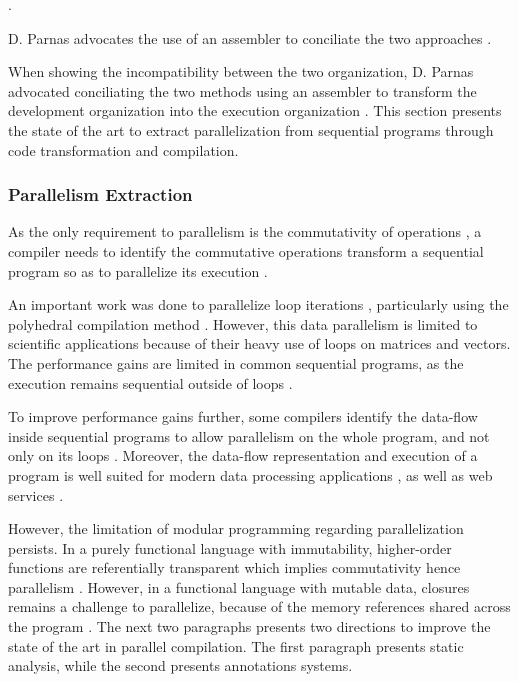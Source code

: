 .

D. Parnas advocates the use of an assembler to conciliate the two approaches \cite{Parnas1972}.

When showing the incompatibility between the two organization, D. Parnas  advocated conciliating the two methods using an assembler to transform the development organization into the execution organization \cite{Parnas1972}.
This section presents the state of the art to extract parallelization from sequential programs through code transformation and compilation.


\subsubsection{Parallelism Extraction}

As the only requirement to parallelism is the commutativity of operations \cite{Rinard1996,Clements2013a}, a compiler needs to identify the commutative operations transform a sequential program so as to parallelize its execution \cite{Rinard1996}.

An important work was done to parallelize loop iterations \cite{Mauras1989,Amarasinghe1995,Chen2008,Banerjee2013,Radoi2014}, particularly using the polyhedral compilation method \cite{Yuki2013,Grosser2011,Trifunovic2010,Bastoul2004}.
However, this data parallelism is limited to scientific applications because of their heavy use of loops on matrices and vectors.
The performance gains are limited in common sequential programs, as the execution remains sequential outside of loops \cite{Amdahl1967,Clements2013a}.

To improve performance gains further, some compilers identify the data-flow inside sequential programs to allow parallelism on the whole program, and not only on its loops \cite{Beck1991,Catanzaro2009,Li2012}.
Moreover, the data-flow representation and execution of a program is well suited for modern data processing applications \cite{Fernandez2014a}, as well as web services \cite{Salmito2013}.

However, the limitation of modular programming regarding parallelization persists.
In a purely functional language with immutability, higher-order functions are referentially transparent which implies commutativity hence parallelism .
However, in a functional language with mutable data, closures remains a challenge to parallelize, because of the memory references shared across the program \cite{Harrison1989, Nicolay2010, Matsakis2012a}.
The next two paragraphs presents two directions to improve the state of the art in parallel compilation.
The first paragraph presents static analysis, while the second presents annotations systems.

